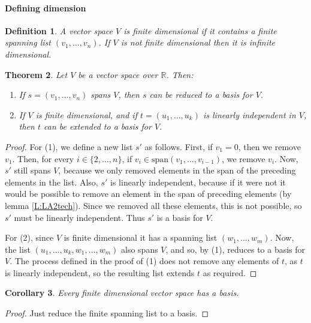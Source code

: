 \documentclass{article}
\theoremstyle{plain}
\newtheorem{theorem}{Theorem}[section]{\bfseries}{\itshape}
\newtheorem{definition}[theorem]{Definition}{\bfseries}{\upshape}
\newtheorem{corollary}[theorem]{Corollary}{\bfseries}{\upshape}
\newcommand{\bR}{\mathbb{R}}
\newcommand{\spa}{\mathrm{span}}
\begin{document}
\paragraph{Defining dimension}

\begin{definition}
A vector space $V$ is \emph{finite dimensional} if it contains a finite spanning list $(v_1,\ldots,v_n)$. If $V$ is not finite dimensional then it is \emph{infinite dimensional}. 
\end{definition}

\begin{theorem}\label{T:LA2basis}
Let $V$ be a vector space over $\bR$. Then:
\begin{enumerate}
\item If $s = (v_1,\ldots,v_n)$ spans $V$, then $s$ can be reduced to a basis for $V$.
\item If $V$ is finite dimensional, and if $t=(u_1,\ldots,u_k)$ is linearly independent in $V$, then $t$ can be extended to a basis for $V$.
\end{enumerate}
\end{theorem}
\begin{proof}
For (1), we define a new list $s'$ as follows. First, if $v_1=0$, then we remove $v_1$.  Then, for every $i\in \{2,\ldots, n\}$, if $v_i\in \spa(v_1,\ldots,v_{i-1})$, we remove $v_i$. Now, $s'$ still spans $V$, because we only removed elements in the span of the preceding elements in the list. Also, $s'$ is linearly independent, because if it were not it would be possible to remove an element in the span of preceding elements (by lemma \ref{L:LA2tech}). Since we removed all these elements, this is not possible, so $s'$ must be linearly independent. Thus $s'$ is a basis for $V$.

For (2), since $V$ is finite dimensional it has a spanning list $(w_1,\ldots,w_m)$. Now, the list $(u_1,\ldots,u_k,w_1,\ldots,w_m)$ also spans $V$, and so, by (1), reduces to a basis for $V$. The process defined in the proof of (1) does not remove any elements of $t$, as $t$ is linearly independent, so the resulting list extends $t$ as required. 
\end{proof}

\begin{corollary}\label{C:basis}
Every finite dimensional vector space has a basis.
\end{corollary}
\begin{proof}
Just reduce the finite spanning list to a basis. 
\end{proof}
\end{document}
